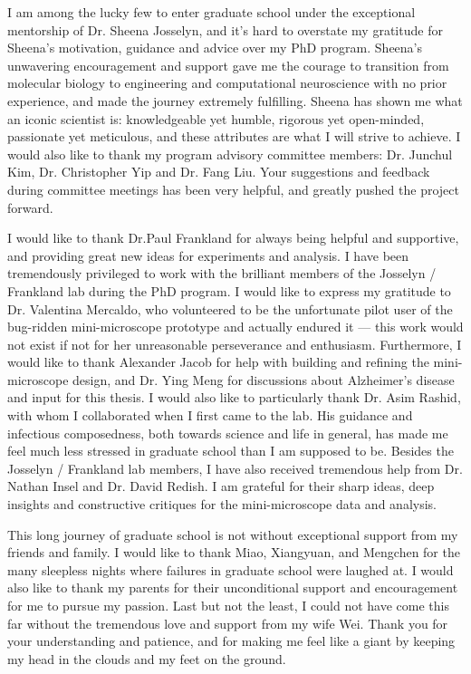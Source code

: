 I am among the lucky few to enter graduate school under the exceptional mentorship of Dr. Sheena Josselyn, and it's hard to overstate my gratitude for Sheena's motivation, guidance and advice over my PhD program. Sheena's unwavering encouragement and support gave me the courage to transition from molecular biology to engineering and computational neuroscience with no prior experience, and made the journey extremely fulfilling. Sheena has shown me what an iconic scientist is: knowledgeable yet humble, rigorous yet open-minded, passionate yet meticulous, and these attributes are what I will strive to achieve. I would also like to thank my program advisory committee members: Dr. Junchul Kim, Dr. Christopher Yip and Dr. Fang Liu. Your suggestions and feedback during committee meetings has been very helpful, and greatly pushed the project forward. 

I would like to thank Dr.Paul Frankland for always being helpful and supportive, and providing great new ideas for experiments and analysis. I have been tremendously privileged to work with the brilliant members of the Josselyn \slash{} Frankland lab during the PhD program. I would like to express my gratitude to Dr. Valentina Mercaldo, who volunteered to be the unfortunate pilot user of the bug-ridden mini-microscope prototype and actually endured it --- this work would not exist if not for her unreasonable perseverance and enthusiasm. Furthermore, I would like to thank Alexander Jacob for help with building and refining the mini-microscope design, and Dr. Ying Meng for discussions about Alzheimer's disease and input for this thesis. I would also like to particularly thank Dr. Asim Rashid, with whom I collaborated when I first came to the lab. His guidance and infectious composedness, both towards science and life in general, has made me feel much less stressed in graduate school than I am supposed to be. Besides the Josselyn \slash{} Frankland lab members, I have also received tremendous help from Dr. Nathan Insel and Dr. David Redish. I am grateful for their sharp ideas, deep insights and constructive critiques for the mini-microscope data and analysis. 

This long journey of graduate school is not without exceptional support from my friends and family.  I would like to thank Miao, Xiangyuan, and Mengchen for the many sleepless nights where failures in graduate school were laughed at. I would also like to thank my parents for their unconditional support and encouragement for me to pursue my passion. Last but not the least, I could not have come this far without the tremendous love and support from my wife Wei. Thank you for your understanding and patience, and for making me feel like a giant by keeping my head in the clouds and my feet on the ground. 
